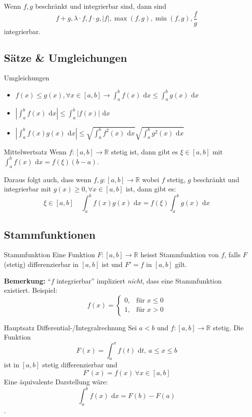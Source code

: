 \documentclass[a4paper,8pt]{extarticle}
\newenvironment{bemerkung}{
   \noindent \textbf{Bemerkung:  }}{}
\def\R{\mathbb{R}}
\def\dx{\text{ d}x}
\begin{document}
\begin{subbox}{}
 Wenn $f,g$ beschränkt und integrierbar sind, dann sind
 $$f+g, \lambda \cdot f, f \cdot g, |f|, \max(f,g), \min(f,g), \frac{f}{g}$$ integrierbar.
\end{subbox}

\subsection{Sätze \& Umgleichungen}
\begin{subbox}{Umgleichungen}
\begin{itemize}
 \item $f(x) \le g(x), \forall x \in [a,b] \rightarrow \int_a^b f(x) \dx \le \int_a^b g(x) \dx$
 \item $\left|\int_a^b f(x) \dx\right| \le \int_a^b |f(x)| \dx$
 \item $\left|\int_a^b f(x) g(x) \dx \right| \le \sqrt{\int_a^b f^2(x) \dx} \sqrt{\int_a^b g^2(x) \dx}$
\end{itemize}
\end{subbox}

\begin{mainbox}{Mittelwertsatz}
 Wenn $f: [a,b] \to \R$ stetig ist, dann gibt es $\xi \in [a,b]$ mit $\int_a^b f(x) \dx = f(\xi) (b-a)$.
\end{mainbox}
Daraus folgt auch, dass wenn $f,g: [a,b] \to \R$ wobei $f$ stetig, $g$ beschränkt und integrierbar mit $g(x) \ge 0, \forall x \in [a,b]$ ist, dann gibt es: $$\xi \in [a,b] \ \ \ \ \ \int_a^b f(x)g(x) \dx = f(\xi) \int_a^b g(x) \dx$$

\subsection{Stammfunktionen}
\begin{subbox}{Stammfunktion}
 Eine Funktion $F: [a,b] \to \R$ heisst Stammfunktion von $f$, falls $F$ (stetig) differenzierbar in $[a,b]$ ist und $F' = f$ in $[a,b]$ gilt.
\end{subbox}
\begin{bemerkung}
``$f$ integrierbar'' impliziert \textit{nicht}, dass eine Stammfunktion existiert. Beispiel:
$$
 f(x) = \begin{cases}
        0, & \text{für } x \le 0 \\
        1, & \text{für } x > 0
        \end{cases}
$$
\end{bemerkung}

\begin{mainbox}{Hauptsatz Differential-/Integralrechnung}
 Sei $a<b$ und $f: [a,b] \to \R$ stetig. Die Funktion 
 $$F(x) = \int_a^x f(t) \text{ d}t, \ a \le x \le b$$
 ist in $[a,b]$ stetig differenzierbar und $$F'(x) = f(x) \ \forall x \in [a,b]$$
 Eine äquivalente Darstellung wäre: $$\int_a^b f(x)\dx = F(b) - F(a)$$.
\end{mainbox}
\end{document}
